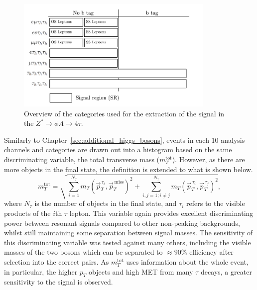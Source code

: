 \begin{figure}[!hbtp]
\centering
    \includegraphics[width=0.85\textwidth]{Figures/event-categories_4tau.pdf}
\caption{Overview of the categories used for the extraction of the signal in the $Z^{*}\rightarrow \phi A \rightarrow 4\tau$.}
\label{fig:4tau_categories}
\end{figure}

Similarly to Chapter~\ref{sec:additional_higgs_bosons}, events in each 10 analysis channels and categories are drawn out into a histogram based on the same discriminating variable, the total transverse mass ($m_{T}^{\text{tot
}}$).
However, as there are more objects in the final state, the definition is extended to what is shown below.
\begin{equation}
m_{T}^{\text{tot}} = \sqrt{ \sum_{i=1}^{N_\tau} m_{T}(\vec{p}_{T}^{\hspace{2pt}\tau_i},\vec{p}_{T}^{\hspace{2pt}\text{miss}})^2 + \sum_{i,j=1; i \neq j}^{N_\tau} m_{T}(\vec{p}_{T}^{\hspace{2pt}\tau_i},\vec{p}_{T}^{\hspace{2pt}\tau_j})^2 },  
\end{equation}
where $N_\tau$ is the number of objects in the final state, and $\tau_i$ refers to the visible products of the $i$th $\tau$ lepton.
This variable again provides excellent discriminating power between resonant signals compared to other non-peaking backgrounds, whilst still maintaining some separation between signal masses.
The sensitivity of this discriminating variable was tested against many others, including the visible masses of the two bosons which can be separated to $\approx 90\%$ efficiency after selection into the correct pairs. 
As $m_{T}^{\text{tot}}$ uses information about the whole event, in particular, the higher $p_{T}$ objects and high \ac{MET} from many $\tau$ decays, a greater sensitivity to the signal is observed. \\

